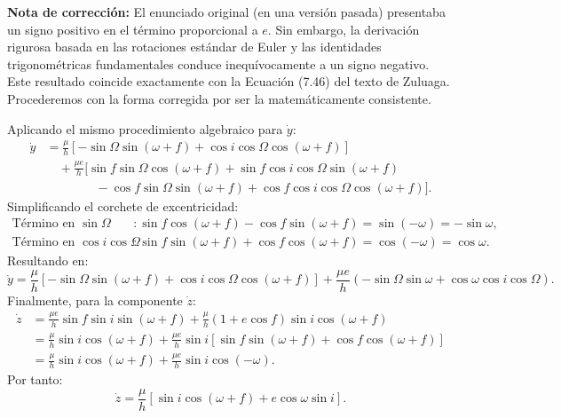 \documentclass[12pt, a4paper]{article}
\begin{document}
\textbf{Nota de corrección:} El enunciado original (en una versión pasada) presentaba un signo positivo en el término proporcional a $e$. Sin embargo, la derivación rigurosa basada en las rotaciones estándar de Euler y las identidades trigonométricas fundamentales conduce inequívocamente a un signo negativo. Este resultado coincide exactamente con la Ecuación (7.46) del texto de Zuluaga. Procederemos con la forma corregida por ser la matemáticamente consistente.

Aplicando el mismo procedimiento algebraico para $\dot{y}$:
\begin{align*}
\dot{y} &= \frac{\mu}{h} \left[ -\sin\Omega \sin(\omega+f) + \cos i \cos\Omega \cos(\omega+f) \right] \\
&\quad + \frac{\mu e}{h} \Big[ \sin f \sin\Omega \cos(\omega+f) + \sin f \cos i \cos\Omega \sin(\omega+f) \\
&\quad\quad\quad\quad - \cos f \sin\Omega \sin(\omega+f) + \cos f \cos i \cos\Omega \cos(\omega+f) \Big].
\end{align*}
Simplificando el corchete de excentricidad:
\begin{align*}
\text{Término en } \sin\Omega &: \sin f \cos(\omega+f) - \cos f \sin(\omega+f) = \sin(-\omega) = -\sin\omega, \\
\text{Término en } \cos i \cos\Omega &: \sin f \sin(\omega+f) + \cos f \cos(\omega+f) = \cos(-\omega) = \cos\omega.
\end{align*}
Resultando en:
\begin{equation}
\dot{y} = \frac{\mu}{h} \left[ -\sin\Omega \sin(\omega+f) + \cos i \cos\Omega \cos(\omega+f) \right] + \frac{\mu e}{h} \left( -\sin\Omega \sin\omega + \cos\omega \cos i \cos\Omega \right).
\end{equation}
Finalmente, para la componente $\dot{z}$:
\begin{align*}
\dot{z} &= \frac{\mu e}{h} \sin f \sin i \sin(\omega+f) + \frac{\mu}{h}(1+e\cos f) \sin i \cos(\omega+f) \\
&= \frac{\mu}{h} \sin i \cos(\omega+f) + \frac{\mu e}{h} \sin i \left[ \sin f \sin(\omega+f) + \cos f \cos(\omega+f) \right] \\
&= \frac{\mu}{h} \sin i \cos(\omega+f) + \frac{\mu e}{h} \sin i \cos(-\omega).
\end{align*}
Por tanto:
\begin{equation}
\dot{z} = \frac{\mu}{h} \left[ \sin i \cos(\omega+f) + e \cos\omega \sin i \right].
\end{equation}
\end{document}
